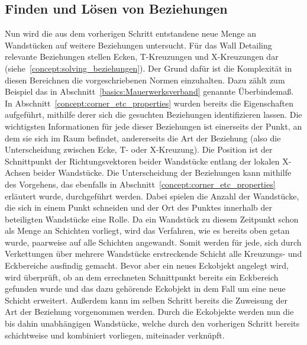 \subsection{Finden und Lösen von Beziehungen}
Nun wird die aus dem vorherigen Schritt entstandene neue Menge an Wandstücken auf weitere Beziehungen untersucht.
Für das Wall Detailing relevante Beziehungen stellen Ecken, T-Kreuzungen und X-Kreuzungen dar (siehe~\ref{concept:solving_beziehungen}).
Der Grund dafür ist die Komplexität in diesen Bereichnen die vorgeschriebenen Normen einzuhalten.
Dazu zählt zum Beispiel das in Abschnitt~\ref{basics:Mauerwerksverband} genannte Überbindemaß.
In Abschnitt~\ref{concept:corner_etc_properties} wurden bereits die Eigenschaften aufgeführt, mithilfe derer sich die gesuchten Beziehungen identifizieren lassen.
Die wichtigsten Informationen für jede dieser Beziehungen ist einerseits der Punkt, an dem sie sich im Raum befindet, andererseits die Art der Beziehung (also die Unterscheidung zwischen Ecke, T- oder X-Kreuzung).
Die Position ist der Schnittpunkt der Richtungsvektoren beider Wandstücke entlang der lokalen X-Achsen beider Wandstücke.
Die Unterscheidung der Beziehungen kann mithilfe des Vorgehens, das ebenfalls in Abschnitt~\ref{concept:corner_etc_properties} erläutert wurde, durchgeführt werden.
Dabei spielen die Anzahl der Wandstücke, die sich in einem Punkt schneiden und der Ort des Punktes innerhalb der beteiligten Wandstücke eine Rolle.
Da ein Wandstück zu diesem Zeitpunkt schon als Menge an Schichten vorliegt, wird das Verfahren, wie es bereits oben getan wurde, paarweise auf alle Schichten angewandt.
Somit werden für jede, sich durch Verkettungen über mehrere Wandstücke erstreckende Schicht alle Kreuzungs- und Eckbereiche ausfindig gemacht.
Bevor aber ein neues \glqq{}Eckobjekt\grqq{} angelegt wird, wird überprüft, ob an dem errechneten Schnittpunkt bereits ein Eckbereich gefunden wurde und das dazu gehörende Eckobjekt in dem Fall um eine neue Schicht erweitert.
Außerdem kann im selben Schritt bereits die Zuweisung der Art der Beziehung vorgenommen werden.
Durch die Eckobjekte werden nun die bis dahin unabhängigen Wandstücke, welche durch den vorherigen Schritt bereits schichtweise und kombiniert vorliegen, miteinader verknüpft.
